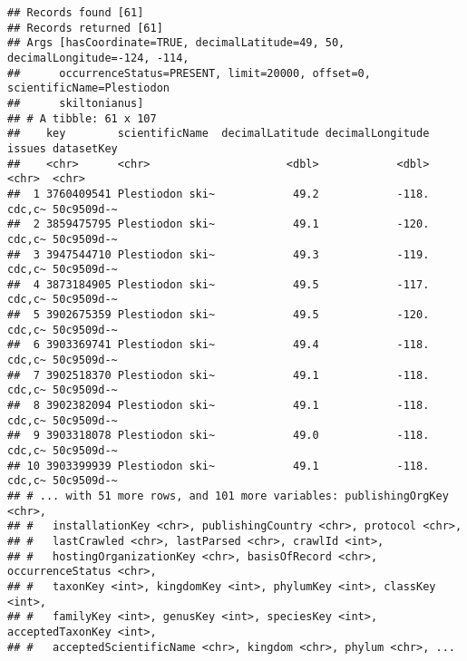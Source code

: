 \documentclass[
]{article}
\begin{document}
\begin{verbatim}
## Records found [61] 
## Records returned [61] 
## Args [hasCoordinate=TRUE, decimalLatitude=49, 50, decimalLongitude=-124, -114,
##      occurrenceStatus=PRESENT, limit=20000, offset=0, scientificName=Plestiodon
##      skiltonianus] 
## # A tibble: 61 x 107
##    key        scientificName  decimalLatitude decimalLongitude issues datasetKey
##    <chr>      <chr>                     <dbl>            <dbl> <chr>  <chr>     
##  1 3760409541 Plestiodon ski~            49.2            -118. cdc,c~ 50c9509d-~
##  2 3859475795 Plestiodon ski~            49.1            -120. cdc,c~ 50c9509d-~
##  3 3947544710 Plestiodon ski~            49.3            -119. cdc,c~ 50c9509d-~
##  4 3873184905 Plestiodon ski~            49.5            -117. cdc,c~ 50c9509d-~
##  5 3902675359 Plestiodon ski~            49.5            -120. cdc,c~ 50c9509d-~
##  6 3903369741 Plestiodon ski~            49.4            -118. cdc,c~ 50c9509d-~
##  7 3902518370 Plestiodon ski~            49.1            -118. cdc,c~ 50c9509d-~
##  8 3902382094 Plestiodon ski~            49.1            -118. cdc,c~ 50c9509d-~
##  9 3903318078 Plestiodon ski~            49.0            -118. cdc,c~ 50c9509d-~
## 10 3903399939 Plestiodon ski~            49.1            -118. cdc,c~ 50c9509d-~
## # ... with 51 more rows, and 101 more variables: publishingOrgKey <chr>,
## #   installationKey <chr>, publishingCountry <chr>, protocol <chr>,
## #   lastCrawled <chr>, lastParsed <chr>, crawlId <int>,
## #   hostingOrganizationKey <chr>, basisOfRecord <chr>, occurrenceStatus <chr>,
## #   taxonKey <int>, kingdomKey <int>, phylumKey <int>, classKey <int>,
## #   familyKey <int>, genusKey <int>, speciesKey <int>, acceptedTaxonKey <int>,
## #   acceptedScientificName <chr>, kingdom <chr>, phylum <chr>, ...
\end{verbatim}
\end{document}
